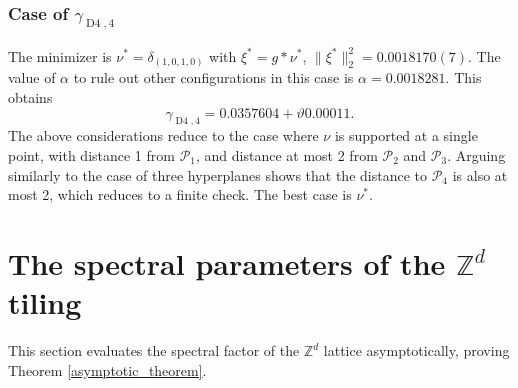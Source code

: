 \documentclass[a4paper, 12pt, notitlepage]{amsart}
\newcommand{\Dfour}{\operatorname{D4}}
\newcommand{\zed}{\mathbb{Z}}
\newcommand{\sP}{{\mathscr{P}}}
\theoremstyle{remark}
\begin{document}
\subsubsection*{Case of $\gamma_{\Dfour,4}$}
   The minimizer is $\nu^* = \delta_{(1,0,1,0)}$ with $\xi^* = g*\nu^*$, $\|\xi^*\|_2^2 = 0.0018170(7)$. The value of $\alpha$ to rule out other configurations in this case is $\alpha = 0.0018281$. This obtains
\begin{equation*}
 \gamma_{\Dfour,4} = 0.0357604+ \vartheta 0.00011.
\end{equation*}
      The above considerations reduce to the case where $\nu$ is supported at a single point, with distance 1 from $\sP_1$, and distance at most 2 from $\sP_2$ and $\sP_3$.  Arguing similarly to the case of three hyperplanes shows that the distance to $\sP_4$ is also at most 2, which reduces to a finite check.  The best case is $\nu^*$.  


\section{The spectral parameters of the $\zed^d$ tiling} \label{zd_section}

This section evaluates the spectral factor of the $\zed^d$ lattice asymptotically, proving Theorem \ref{asymptotic_theorem}.
\end{document}

